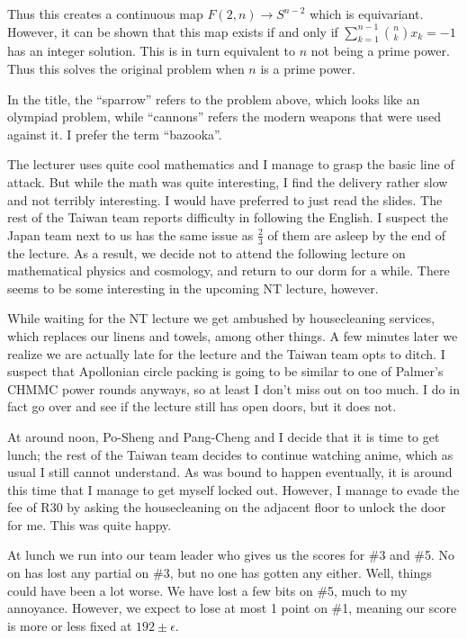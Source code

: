 \documentclass[11pt]{scrreprt}
\numberwithin{figure}{chapter}
\begin{document}
Thus this creates a continuous map $F(2,n) \to S^{n-2}$ which is equivariant.
However, it can be shown that this map exists if and only if
$\sum_{k=1}^{n-1} \binom nk x_k = -1$
has an integer solution. This is in turn equivalent to $n$ not being a prime power.
Thus this solves the original problem when $n$ is a prime power.

In the title, the ``sparrow'' refers to the problem above, which looks like an olympiad problem,
while ``cannons'' refers the modern weapons that were used against it.
I prefer the term ``bazooka''.

The lecturer uses quite cool mathematics and I manage to grasp the basic line of attack.
But while the math was quite interesting, I find the delivery rather slow and not terribly interesting.
I would have preferred to just read the slides.
The rest of the Taiwan team reports difficulty in following the English.
I suspect the Japan team next to us has the same issue as $\tfrac 23$ of them are asleep by the end
of the lecture.
As a result, we decide not to attend the following lecture on mathematical physics and cosmology,
and return to our dorm for a while.
There seems to be some interesting in the upcoming NT lecture, however.

While waiting for the NT lecture we get ambushed by housecleaning services,
which replaces our linens and towels,
among other things. A few minutes later we realize we are actually late for the
lecture and the Taiwan team opts
to ditch. I suspect that Apollonian circle packing is going to be similar to one
of Palmer's CHMMC power rounds anyways, so
at least I don't miss out on too much.
I do in fact go over and see if the lecture still has open doors, but it does not.

At around noon, Po-Sheng and Pang-Cheng and I decide that it is time to get lunch;
the rest of the Taiwan team decides to continue watching
anime, which as usual I still cannot understand.
As was bound to happen eventually, it is around this time that I manage to get myself locked out.
However, I manage to evade the fee of R30 by asking the housecleaning on the
adjacent floor to unlock the door for me.
This was quite happy.

At lunch we run into our team leader who gives us the scores for \#3 and \#5.
No on has lost any partial on \#3, but no one has gotten any either.
Well, things could have been a lot worse.
We have lost a few bits on \#5, much to my annoyance.
However, we expect to lose at most 1 point on \#1,
meaning our score is more or less fixed at $192 \pm \epsilon$.
\end{document}
